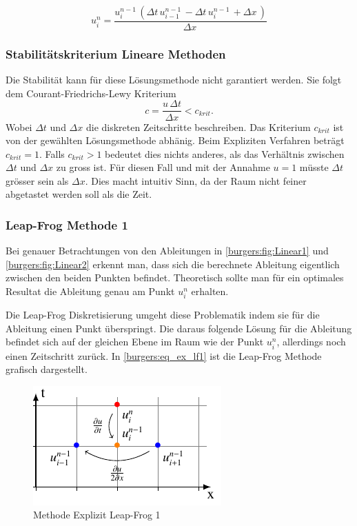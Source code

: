 	\begin{equation}
		u_{i}^{n} = \frac{u^{n-1}_{i}\, \left(\Delta{t}\, u^{n-1}_{i-1}\, - \Delta{t}\, u^{n-1}_{i}\, + \Delta{x}\,\right)}{\Delta{x}\,}
    	\label{burgers:eq_ex_sol_lin2}
	\end{equation}
	
\subsubsection{Stabilit\"atskriterium Lineare Methoden}
	Die Stabilit\"at kann f\"ur diese L\"osungsmethode nicht garantiert werden.
	Sie folgt dem Courant-Friedrichs-Lewy Kriterium
	\begin{equation}
		  c = \frac{u \, \Delta t}{\Delta x} < c_{krit}.
	\end{equation}
	Wobei $ \Delta t$ und $\Delta x$ die diskreten Zeitschritte beschreiben.
	Das Kriterium $c_{krit}$ ist von der gew\"ahlten L\"osungsmethode abh\"anig.
	Beim Expliziten Verfahren beträgt $c_{krit} = 1$.
	Falls $c_{krit} > 1$ bedeutet dies nichts anderes, als das Verh\"altnis zwischen $ \Delta t$ und $\Delta x$ zu gross ist.
	F\"ur diesen Fall und mit der Annahme $u = 1$ m\"usste $ \Delta t$ gr\"osser sein als $\Delta x$.
	Dies macht intuitiv Sinn, da der Raum nicht feiner abgetastet werden soll als die Zeit.
	
	
	
\subsubsection{Leap-Frog Methode 1}
	
	Bei genauer Betrachtungen von den Ableitungen in \ref{burgers:fig:Linear1} und \ref{burgers:fig:Linear2} erkennt man, dass sich die berechnete Ableitung eigentlich zwischen den beiden Punkten befindet.
	Theoretisch sollte man für ein optimales Resultat die Ableitung genau am Punkt $u_{i}^{n}$ erhalten.
	
	\medskip
	Die Leap-Frog Diskretisierung umgeht diese Problematik indem sie f\"ur die Ableitung einen Punkt \"uberspringt.
	Die daraus folgende L\"osung für die Ableitung befindet sich auf der gleichen Ebene im Raum wie der Punkt $u_{i}^{n}$, allerdings noch einen Zeitschritt zurück.
	In \ref{burgers:eq_ex_lf1} ist die Leap-Frog Methode grafisch dargestellt.
	
	
	\begin{figure}
	\centering
	\includegraphics[height=.4\textwidth]{papers/burgers/BurgersEquation/tikz/Linear3/Linear3.pdf}
	\caption{Methode Explizit Leap-Frog 1}
	\label{burgers:fig:Linear3}
	\end{figure}
	
